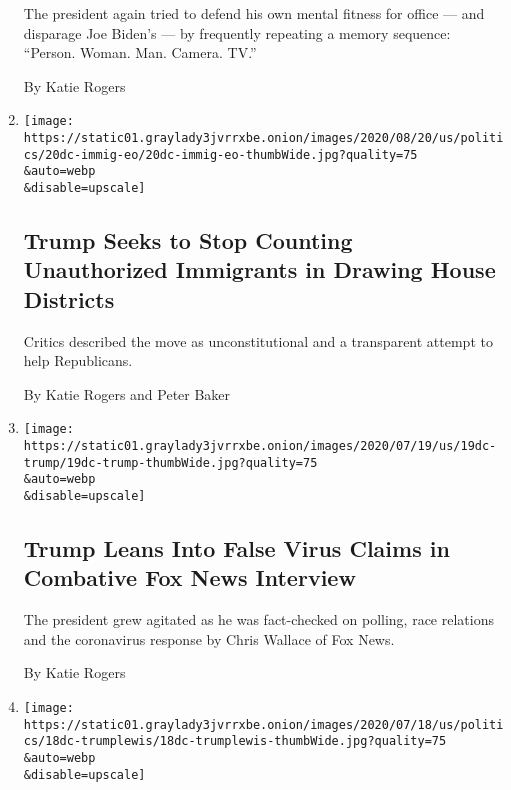 \begin{enumerate}
  The president again tried to defend his own mental fitness for office
  --- and disparage Joe Biden's --- by frequently repeating a memory
  sequence: ``Person. Woman. Man. Camera. TV.''

  By Katie Rogers
\item
  \href{/2020/07/21/us/politics/trump-immigrants-census-redistricting.html}{}

  \texttt{[image: https://static01.graylady3jvrrxbe.onion/images/2020/08/20/us/politics/20dc-immig-eo/20dc-immig-eo-thumbWide.jpg?quality=75\\\&auto=webp\\\&disable=upscale]}

  \hypertarget{trump-seeks-to-stop-counting-unauthorized-immigrants-in-drawing-house-districts}{%
  \subsection{Trump Seeks to Stop Counting Unauthorized Immigrants in
  Drawing House
  Districts}\label{trump-seeks-to-stop-counting-unauthorized-immigrants-in-drawing-house-districts}}

  Critics described the move as unconstitutional and a transparent
  attempt to help Republicans.

  By Katie Rogers and Peter Baker
\item
  \href{/2020/07/19/us/politics/trump-fox-interview-coronavirus-race.html}{}

  \texttt{[image: https://static01.graylady3jvrrxbe.onion/images/2020/07/19/us/19dc-trump/19dc-trump-thumbWide.jpg?quality=75\\\&auto=webp\\\&disable=upscale]}

  \hypertarget{trump-leans-into-false-virus-claims-in-combative-fox-news-interview}{%
  \subsection{Trump Leans Into False Virus Claims in Combative Fox News
  Interview}\label{trump-leans-into-false-virus-claims-in-combative-fox-news-interview}}

  The president grew agitated as he was fact-checked on polling, race
  relations and the coronavirus response by Chris Wallace of Fox News.

  By Katie Rogers
\item
  \href{/2020/07/18/us/politics/john-lewis-trump.html}{}

  \texttt{[image: https://static01.graylady3jvrrxbe.onion/images/2020/07/18/us/politics/18dc-trumplewis/18dc-trumplewis-thumbWide.jpg?quality=75\\\&auto=webp\\\&disable=upscale]}


\end{enumerate}
